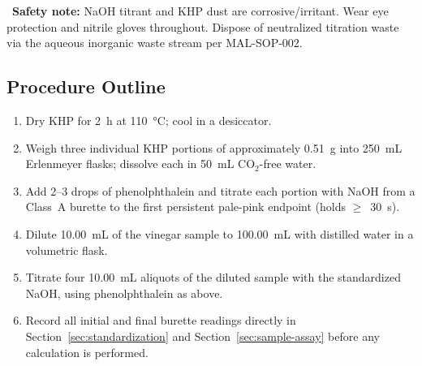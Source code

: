 \vspace{5pt}

\begin{tcolorbox}[safetybox]
\faExclamationTriangle\ \textbf{Safety note:} NaOH titrant and KHP dust are corrosive/irritant.
Wear eye protection and nitrile gloves throughout. Dispose of neutralized titration waste via
the aqueous inorganic waste stream per MAL-SOP-002.
\end{tcolorbox}

\subsection{Procedure Outline}
\begin{enumerate}[leftmargin=1.4em]
  \item Dry KHP for 2~h at \SI{110}{\celsius}; cool in a desiccator.
  \item Weigh three individual KHP portions of approximately \SI{0.51}{\gram} into 250~mL
        Erlenmeyer flasks; dissolve each in 50~mL CO$_2$-free water.
  \item Add 2--3 drops of phenolphthalein and titrate each portion with NaOH from a Class~A
        burette to the first persistent pale-pink endpoint (holds $\geq$~30~s).
  \item Dilute 10.00~mL of the vinegar sample to 100.00~mL with distilled water in a volumetric
        flask.
  \item Titrate four 10.00~mL aliquots of the diluted sample with the standardized NaOH, using
        phenolphthalein as above.
  \item Record all initial and final burette readings directly in Section~\ref{sec:standardization}
        and Section~\ref{sec:sample-assay} before any calculation is performed.
\end{enumerate}
